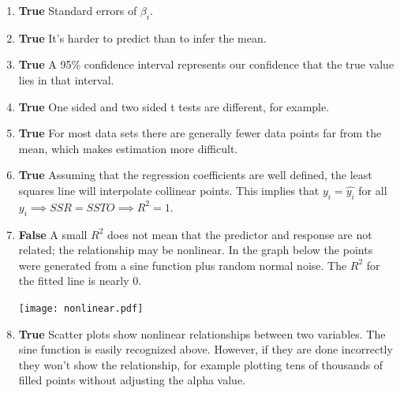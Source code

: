 \documentclass[12pt]{article}
\begin{document}
\begin{enumerate}[label=\alph*]
\item \textbf{True} Standard errors of $\beta_i$. 

\item \textbf{True} It's harder to predict than to infer the mean.

\item \textbf{True} A 95\% confidence interval represents our confidence that
the true value lies in that interval.

\item \textbf{True} One sided and two sided t tests are different, for
example.

\item \textbf{True} For most data sets there are generally fewer data points far from the mean,
which makes estimation more difficult. 

\item \textbf{True} Assuming that the regression coefficients are well 
defined, the least squares line will interpolate collinear points. This
implies that $y_i = \hat{y_i}$ for all $y_i \implies SSR = SSTO \implies R^2 = 1$.

\item \textbf{False} A small $R^2$ does not mean that the predictor and
response are not related; the relationship may be nonlinear. In the graph
below the points were generated from a sine function plus random normal
noise. The $R^2$ for the fitted line is nearly 0.

\centerline{\texttt{[image: nonlinear.pdf]}}

\item \textbf{True} Scatter plots show nonlinear relationships between two
variables. The sine function is easily recognized above. However, if they are done incorrectly they won't show the
relationship, for example plotting tens of thousands of filled points without adjusting the
alpha value. 

\end{enumerate}
\end{document}
